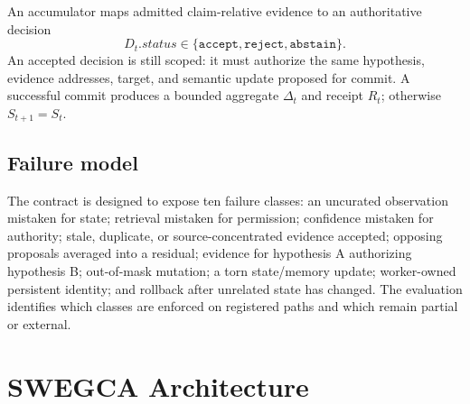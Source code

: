 \documentclass[10pt]{article}
\begin{document}
An accumulator maps admitted claim-relative evidence to an authoritative decision
\begin{equation}
  D_t.status\in\{\texttt{accept},\texttt{reject},\texttt{abstain}\}.
\end{equation}
An accepted decision is still scoped: it must authorize the same hypothesis, evidence addresses, target, and semantic update proposed for commit. A successful commit produces a bounded aggregate $\Delta_t$ and receipt $R_t$; otherwise $S_{t+1}=S_t$.

\subsection{Failure model}

The contract is designed to expose ten failure classes: an uncurated observation mistaken for state; retrieval mistaken for permission; confidence mistaken for authority; stale, duplicate, or source-concentrated evidence accepted; opposing proposals averaged into a residual; evidence for hypothesis A authorizing hypothesis B; out-of-mask mutation; a torn state/memory update; worker-owned persistent identity; and rollback after unrelated state has changed. The evaluation identifies which classes are enforced on registered paths and which remain partial or external.

\section{SWEGCA Architecture}
\end{document}
